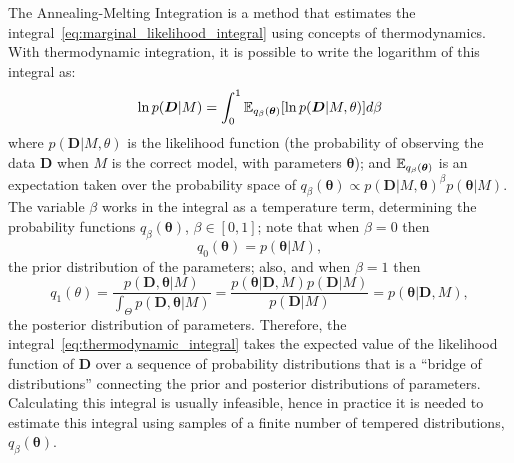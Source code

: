 The Annealing-Melting Integration is a method that estimates the 
integral~\ref{eq:marginal_likelihood_integral} using concepts of 
thermodynamics. With thermodynamic integration, it is possible to write 
the logarithm of this integral as:
\begin{equation}
    \ln p({\bm D}|M) 
            = \int_0^1 \mathbb{E}_{q_\beta({\bm \theta})} 
              [\ln p({\bm D} | M, \theta)] d\beta
        \label{eq:thermodynamic_integral}
\end{equation}
where $p({\bm D}|M,\theta)$ is the likelihood function (the 
probability of observing the data ${\bm D}$ when $M$ is the correct
model, with parameters ${\bm \theta}$); and 
$\mathbb{E}_{q_\beta ({\bm \theta})}$ is an expectation taken over the 
probability space of 
$q_\beta({\bm \theta}) \propto 
p({\bm D}|M, {\bm \theta})^\beta p({\bm \theta}|M)$. The variable 
$\beta$ works in the integral as a temperature term, determining the 
probability functions $q_{\beta}({\bm \theta})$, $\beta \in [0, 1]$; 
note that when $\beta = 0$ then 
\begin{equation*}
q_0({\bm \theta}) = p({\bm \theta}|M),
\end{equation*}
the prior distribution of the parameters; also, and when 
$\beta = 1$ then 
\begin{equation*}
    q_1(\theta) = \frac{p({\bm D}, {\bm \theta}| M)} {\int_{\Theta}
                            p({\bm D}, {\bm \theta}| M)} 
                = \frac{p({\bm \theta} | {\bm D}, M)p({\bm D}|M)} 
                        {p({\bm D} | M)}
                = p({\bm \theta} | {\bm D}, M),
\end{equation*}
the posterior distribution of parameters. Therefore, the 
integral~\ref{eq:thermodynamic_integral} takes the expected value of the
likelihood function of ${\bm D}$ over a sequence of probability 
distributions that is a ``bridge of distributions'' connecting the prior
and posterior distributions of parameters. Calculating this integral is 
usually infeasible, hence in practice it is needed to estimate this 
integral using samples of a finite number of tempered distributions, 
$q_\beta({\bm \theta})$.

